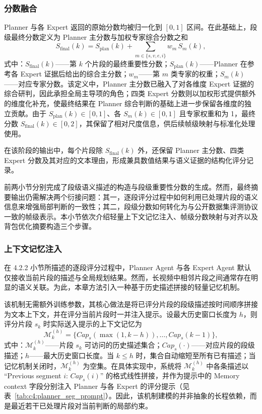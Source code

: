 \subsubsection{分数融合}
Planner 与各 Expert 返回的原始分数均被归一化到 $[0,1]$ 区间。在此基础上，段级最终分数定义为 Planner 主分数与加权专家综合分数之和
\begin{equation}
  S_{\mathrm{final}}(k)=S_{\mathrm{plan}}(k)+\sum_{m \in \{s,v,e,i\}} w_m\, S_m(k),
\end{equation}
式中：$S_{\mathrm{final}}(k)$——第 $k$ 个片段的最终重要性分数；$S_{\mathrm{plan}}(k)$——Planner 在参考各 Expert 证据后给出的综合主分数；$w_m$——第 $m$ 类专家的权重；$S_m(k)$——对应专家分数。该定义中，Planner 主分数已融入了对各维度 Expert 证据的综合研判，因此承担全局主导项的角色；四类 Expert 分数则以加权形式提供额外的维度化补充，使最终结果在 Planner 综合判断的基础上进一步保留各维度的独立贡献。由于 $S_{\mathrm{plan}}(k)\in[0,1]$、各 $S_m(k)\in[0,1]$ 且专家权重和为 1，最终分数 $S_{\mathrm{final}}(k)\in[0,2]$，其保留了相对尺度信息，供后续帧级映射与标准化处理使用。

在该阶段的输出中，每个片段除 $S_{\mathrm{final}}(k)$ 外，还保留 Planner 主分数、四类 Expert 分数及其对应的文本理由，形成兼具数值结果与语义证据的结构化评分记录。




前两小节分别完成了段级语义描述的构造与段级重要性分数的生成。然而，最终摘要输出仍需解决两个衍接问题：其一，逐段评分过程中如何利用已处理片段的语义信息来增强局部判断的一致性；其二，段级分数如何转化为与公开数据集评测协议一致的帧级表示。本小节依次介绍轻量上下文记忆注入、帧级分数映射与对齐以及背包优化摘要构造三个步骤。

\subsubsection{上下文记忆注入}
在 4.2.2 小节所描述的逐段评分过程中，Planner Agent 与各 Expert Agent 默认仅接收当前片段的描述与全局规划结果。然而，长视频中相邻片段之间通常存在明显的语义关联。为此，本章方法引入一种基于历史描述拼接的轻量记忆机制。

该机制无需额外训练参数，其核心做法是将已评分片段的段级描述按时间顺序拼接为文本上下文，并在评分当前片段时一并注入提示。设最大历史窗口长度为 $h$，则评分片段 $s_k$ 时实际送入提示的上下文记忆为
\begin{equation}
  \mathcal{M}_k^{(h)}=\{Cap_s(\max(1,k{-}h)),\dots,Cap_s(k{-}1)\},
\end{equation}
式中：$\mathcal{M}_k^{(h)}$——片段 $s_k$ 可访问的历史描述集合；$Cap_s(\cdot)$——对应片段的段级描述；$h$——最大历史窗口长度。当 $k \le h$ 时，集合自动缩短至所有已有描述；当记忆机制关闭时，$\mathcal{M}_k^{(h)}$ 为空集。在具体实现中，系统将 $\mathcal{M}_k^{(h)}$ 中各条描述以 ``Previous segment $i$: $Cap_s(i)$'' 的格式线性拼接，并作为提示中的 Memory context 字段分别注入 Planner 与各 Expert 的评分提示（见表~\ref{tab:c4:planner_seg_prompt}）。因此，该机制建模的并非抽象的长程依赖，而是最近若干已处理片段对当前判断的局部约束。

